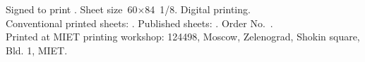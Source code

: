 \begin{otherlanguage}{english}
\begin{flushleft}
     \vspace{1em}
    Signed to print \esgiPDate. Sheet size 60\(×\)84 1/8. Digital printing.\\
    Conventional printed sheets: \esgiUPL{}. Published sheets: \esgiUIL{}. Order No.~\esgiPRN{}.\\
    Printed at MIET printing workshop: 124498, Moscow, Zelenograd, Shokin square, Bld. 1, MIET.
\end{flushleft}

\end{otherlanguage}

\normalsize
\setmainlinespread

